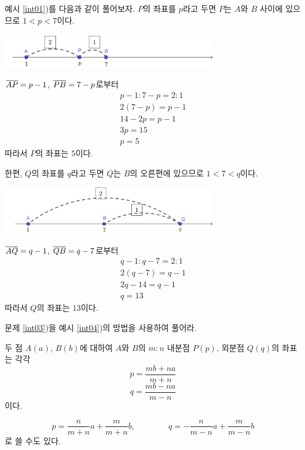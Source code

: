 \documentclass{oblivoir}
\begin{document}
\clearpage
%
\exam{}\label{int04}
예시 \ref{int01})를 다음과 같이 풀어보자.
\(P\)의 좌표를 \(p\)라고 두면 \(P\)는 \(A\)와 \(B\) 사이에 있으므로 \(1<p<7\)이다.
\begin{center}
\includegraphics[width=0.7\textwidth]{int_04}
\end{center}
\(\overline{AP}=p-1\), \(\overline{PB}=7-p\)로부터
\begin{gather*}
p-1:7-p=2:1\\
2(7-p)=p-1\\
14-2p=p-1\\
3p=15\\
p=5
\end{gather*}
따라서 \(P\)의 좌표는 \(5\)이다.

\medskip
한편, \(Q\)의 좌표를 \(q\)라고 두면 \(Q\)는 \(B\)의 오른편에 있으므로 \(1<7<q\)이다.
\begin{center}
\includegraphics[width=0.7\textwidth]{int_05}
\end{center}
\(\overline{AQ}=q-1\), \(\overline{QB}=q-7\)로부터
\begin{gather*}
q-1:q-7=2:1\\
2(q-7)=q-1\\
2q-14=q-1\\
q=13
\end{gather*}
따라서 \(Q\)의 좌표는 \(13\)이다.

%
\prob{}\label{int06}
문제 \ref{int03})을 예시 \ref{int04})의 방법을 사용하여 풀어라.
\clearpage

\bigskip
%
\begin{mdframed}
\label{int07}
두 점 \(A(a)\), \(B(b)\)에 대하여
\(A\)와 \(B\)의 \(m:n\) 내분점 \(P(p)\), 외분점 \(Q(q)\)의 좌표는 각각
\[p=\frac{mb+na}{m+n}\]
\[q=\frac{mb-na}{m-n}\]
이다.
\end{mdframed}
\[
p=\frac n{m+n}a+\frac m{m+n}b,
\qquad\qquad
q=-\frac n{m-n}a+\frac m{m-n}b
\]
로 쓸 수도 있다.
\end{document}
